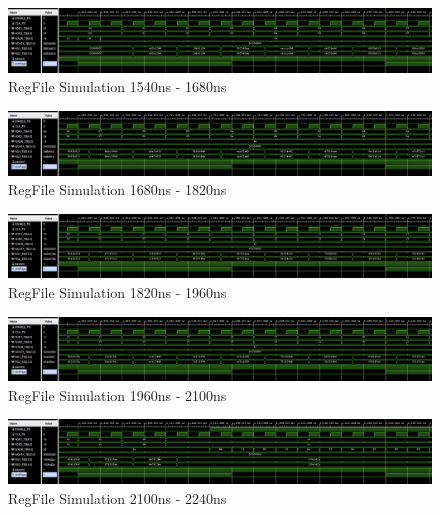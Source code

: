 \documentclass[
    a4paper, %
	12pt, %
    ]{CSSullivanBusinessReport}
\begin{document}
\begin{fullwidth}
\begin{figure}[H]
    \centering
    \captionsetup{style=widetable}
    \includegraphics[width=.80\pdfpagewidth]{Figures/RegFile Simulation 11.png}
    \caption{RegFile Simulation 1540ns - 1680ns}
    \label{fig:regfilesim12}
\end{figure}

\begin{figure}[H]
    \centering
    \captionsetup{style=widetable}
    \includegraphics[width=.80\pdfpagewidth]{Figures/RegFile Simulation 12.png}
    \caption{RegFile Simulation 1680ns - 1820ns}
    \label{fig:regfilesim13}
\end{figure}

\begin{figure}[H]
    \centering
    \captionsetup{style=widetable}
    \includegraphics[width=.80\pdfpagewidth]{Figures/RegFile Simulation 13.png}
    \caption{RegFile Simulation 1820ns - 1960ns}
    \label{fig:regfilesim14}
\end{figure}

\begin{figure}[H]
    \centering
    \captionsetup{style=widetable}
    \includegraphics[width=.80\pdfpagewidth]{Figures/RegFile Simulation 14.png}
    \caption{RegFile Simulation 1960ns - 2100ns}
    \label{fig:regfilesim15}
\end{figure}

\begin{figure}
    \centering
    \captionsetup{style=widetable}
    \includegraphics[width=.80\pdfpagewidth]{Figures/RegFile Simulation 15.png}
    \caption{RegFile Simulation 2100ns - 2240ns}
    \label{fig:regfilesim16}
\end{figure}


\end{fullwidth}
\end{document}
